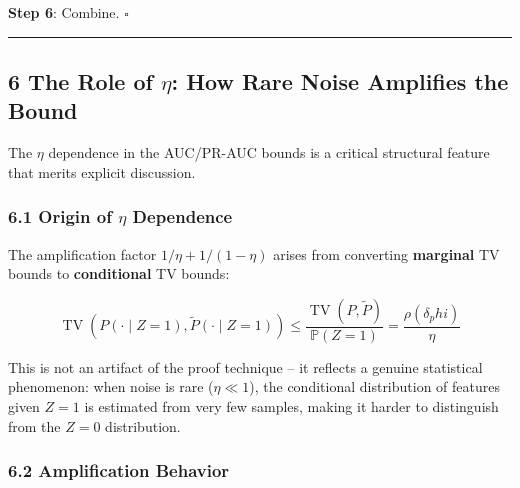 \documentclass[
  12pt,
]{ctexart}
\begin{document}
\textbf{Step 6}: Combine. \(\square\)

\begin{center}\rule{0.5\linewidth}{0.5pt}\end{center}

\subsection{\texorpdfstring{6 The Role of \(\eta\): How Rare Noise
Amplifies the
Bound}{6 The Role of \textbackslash eta: How Rare Noise Amplifies the Bound}}\label{the-role-of-eta-how-rare-noise-amplifies-the-bound}

The \(\eta\) dependence in the AUC/PR-AUC bounds is a critical
structural feature that merits explicit discussion.

\subsubsection{\texorpdfstring{6.1 Origin of \(\eta\)
Dependence}{6.1 Origin of \textbackslash eta Dependence}}\label{origin-of-eta-dependence}

The amplification factor \(1/\eta + 1/(1-\eta)\) arises from converting
\textbf{marginal} TV bounds to \textbf{conditional} TV bounds:

\[\operatorname{TV}(P(\cdot \mid Z=1), \tilde{P}(\cdot \mid Z=1)) \leq \frac{\operatorname{TV}(P, \tilde{P})}{\mathbb{P}(Z=1)} = \frac{\rho(\delta_phi)}{\eta}\]

This is not an artifact of the proof technique -- it reflects a genuine
statistical phenomenon: when noise is rare (\(\eta \ll 1\)), the
conditional distribution of features given \(Z=1\) is estimated from
very few samples, making it harder to distinguish from the \(Z=0\)
distribution.

\subsubsection{6.2 Amplification Behavior}\label{amplification-behavior}
\end{document}
